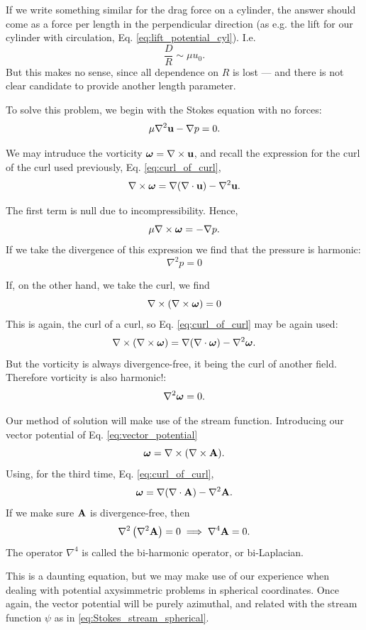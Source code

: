 If we write something similar for the drag force on a cylinder, the
answer should come as a force per length in the perpendicular
direction (as e.g. the lift for our cylinder with circulation,
Eq. \ref{eq:lift_potential_cyl}). I.e.
\[
  \frac{D}{R} \sim \mu u_0 .
\]
But this makes no sense, since all dependence on $R$ is lost --- and
there is not clear candidate to provide another length parameter.

To solve this problem, we begin with the Stokes equation with no
forces:
\begin{equation}
  \label{eq:Stokes_no_f}
  \mu \nabla^2 \mathbf{u} -\nabla p = 0 .
\end{equation}

We may intruduce the vorticity $\bm{\omega}=\nabla\times\mathbf{u}$, and recall
the expression for the curl of the curl used previously,
Eq. \ref{eq:curl_of_curl},
%
\begin{equation*}
  \nabla \times \bm{\omega} =
  \nabla (\nabla \cdot \mathbf{u} )-\nabla^{2} \mathbf{u} .
\end{equation*}

The first term is null due to incompressibility. Hence,
\[
\mu \nabla \times \bm{\omega} = - \nabla p.
\]
If we take the divergence of this expression we find that the pressure
is harmonic:
\[
  \nabla^2 p = 0
\]

If, on the other hand, we take the curl, we find
\[
  \nabla \times \left(\nabla \times \bm{\omega} \right)= 0
\]
This is again, the curl of a curl, so Eq. \ref{eq:curl_of_curl} may be
again used:
\begin{equation*}
  \nabla \times \left(\nabla \times \bm{\omega} \right)=
  \nabla (\nabla \cdot \bm{\omega} )-\nabla^{2}\bm{\omega} .
\end{equation*}
But the vorticity is always divergence-free, it being the curl of
another field. Therefore vorticity is also harmonic!:
\[
  \nabla^2 \bm{\omega} = 0 .
\]

Our method of solution will make use of the stream
function. Introducing our vector potential of
Eq. \ref{eq:vector_potential}
\[
  \bm{\omega} = \nabla \times ( \nabla \times \mathbf{A} ) .
\]
Using, for the third time,  Eq. \ref{eq:curl_of_curl},
\[
  \bm{\omega} =   \nabla (\nabla \cdot \mathbf {A} )-\nabla^2\mathbf{A} .
\]
If we make sure $\mathbf{A}$ is divergence-free, then
\[
  \nabla^2 \left( \nabla^2\mathbf{A} \right) = 0 \implies
  \nabla^4 \mathbf{A}  = 0 .
\]
The operator $\nabla^4$ is called the bi-harmonic operator, or
bi-Laplacian. 

This is a daunting equation, but we may make use of our experience
when dealing with potential axysimmetric problems in spherical
coordinates. Once again, the vector potential will be purely
azimuthal, and related with the stream function $\psi$ as in
\ref{eq:Stokes_stream_spherical}.

